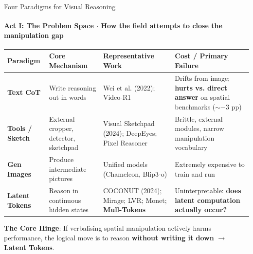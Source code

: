 \documentclass[aspectratio=169, 10pt]{beamer}
\begin{document}
\begin{frame}{Four Paradigms for Visual Reasoning}
  \framesubtitle{Act I: The Problem Space $\cdot$ How the field attempts to close the manipulation gap}
  
  \centering
  \scriptsize
  \begin{tabular}{lp{3.3cm}p{3.2cm}p{3.8cm}}
    \toprule
    \textbf{Paradigm} & \textbf{Core Mechanism} & \textbf{Representative Work} & \textbf{Cost / Primary Failure} \\
    \midrule
    \textbf{Text CoT} & Write reasoning out in words & Wei et al. (2022); Video-R1 & Drifts from image; \alert{\textbf{hurts vs. direct answer}} on spatial benchmarks ($\sim -3$ pp) \\
    \addlinespace
    \textbf{Tools / Sketch} & External cropper, detector, sketchpad & Visual Sketchpad (2024); DeepEyes; Pixel Reasoner & Brittle, external modules, narrow manipulation vocabulary \\
    \addlinespace
    \textbf{Gen Images} & Produce intermediate pictures & Unified models (Chameleon, Blip3-o) & Extremely expensive to train and run \\
    \addlinespace
    \rowcolor{accentlight!50}
    \textbf{Latent Tokens} & Reason in continuous hidden states & COCONUT (2024); Mirage; LVR; Monet; \textbf{Mull-Tokens} & Uninterpretable: \textbf{does latent computation actually occur?} \\
    \bottomrule
  \end{tabular}
  
  \vspace{8pt}
  \begin{tcolorbox}[accentcard]
    \small \textbf{The Core Hinge}: If verbalising spatial manipulation actively harms performance, the logical move is to reason \textbf{without writing it down} $\rightarrow$ \textbf{Latent Tokens}.
  \end{tcolorbox}

\end{frame}
\end{document}
